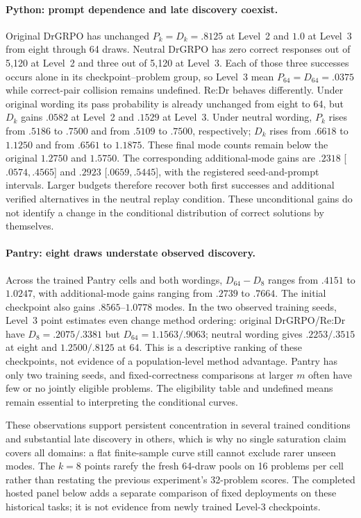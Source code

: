 \documentclass{article}
\newcommand{\1}{\mathbf 1}
\theoremstyle{remark}
\theoremstyle{definition}
\theoremstyle{plain}
\begin{document}
\paragraph{Python: prompt dependence and late discovery coexist.}
Original DrGRPO has unchanged $P_k=D_k=.8125$ at Level~2 and $1.0$ at
Level~3 from eight through 64 draws. Neutral DrGRPO has zero correct responses
out of 5,120 at Level~2 and three out of 5,120 at Level~3. Each of those
three successes occurs alone in its checkpoint--problem group, so Level~3
mean $P_{64}=D_{64}=.0375$ while correct-pair collision remains undefined.
Re:Dr behaves differently. Under original wording its pass probability
is already unchanged from eight to 64, but $D_k$ gains $.0582$ at Level~2
and $.1529$ at Level~3. Under neutral wording, $P_k$ rises from $.5186$ to
$.7500$ and from $.5109$ to $.7500$, respectively; $D_k$ rises from $.6618$
to $1.1250$ and from $.6561$ to $1.1875$. These final mode counts remain
below the original $1.2750$ and $1.5750$. The corresponding additional-mode
gains are $.2318$ [$.0574,.4565$] and $.2923$ [$.0659,.5445$], with the
registered seed-and-prompt intervals. Larger budgets therefore recover both
first successes and additional verified alternatives in the neutral replay
condition. These unconditional gains do not identify a change in the
conditional distribution of correct solutions by themselves.

\paragraph{Pantry: eight draws understate observed discovery.}
Across the trained Pantry cells and both wordings, $D_{64}-D_8$ ranges
from $.4151$ to $1.0247$, with additional-mode gains ranging from $.2739$
to $.7664$. The initial checkpoint also gains $.8565$--$1.0778$ modes.
In the two observed training seeds, Level~3 point estimates even change
method ordering: original DrGRPO/Re:Dr have $D_8=.2075/.3381$
but $D_{64}=1.1563/.9063$; neutral wording gives $.2253/.3515$ at eight
and $1.2500/.8125$ at 64. This is a descriptive ranking of these checkpoints,
not evidence of a population-level method advantage. Pantry has only two
training seeds, and fixed-correctness comparisons at larger $m$ often have
few or no jointly eligible problems. The eligibility table and undefined
means remain essential to interpreting the conditional curves.

These observations support persistent concentration in several trained
conditions and substantial late discovery in others, which is why no single
saturation claim covers all domains: a flat finite-sample curve still cannot
exclude rarer unseen modes. The $k=8$ points rarefy the fresh 64-draw pools on
16 problems per cell rather than restating the previous experiment's
32-problem scores. The completed hosted panel below
adds a separate comparison of fixed deployments on these historical tasks;
it is not evidence from newly trained Level-3 checkpoints.
\end{document}
